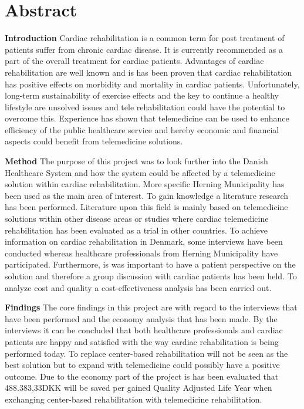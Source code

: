 \chapter{Abstract}

\textbf{Introduction} \newline
Cardiac rehabilitation is a common term for post treatment of patients suffer from chronic cardiac disease. It is currently recommended as a part of the overall treatment for cardiac patients. Advantages of cardiac rehabilitation are well known and is has been proven that cardiac rehabilitation has positive effects on morbidity and mortality in cardiac patients. Unfortunately, long-term sustainability of exercise effects and the key to continue a healthy lifestyle are unsolved issues and tele rehabilitation could have the potential to overcome this. Experience has shown that telemedicine can be used to enhance efficiency of the public healthcare service and hereby economic and financial aspects could benefit from telemedicine solutions.  

\textbf{Method} \newline
The purpose of this project was to look further into the Danish Healthcare System and how the system could be affected by a telemedicine solution within cardiac rehabilitation. More specific Herning Municipality has been used as the main area of interest. To gain knowledge a literature research has been performed. Literature upon this field is mainly based on telemedicine solutions within other disease areas or studies where cardiac telemedicine rehabilitation has been evaluated as a trial in other countries. To achieve information on cardiac rehabilitation in Denmark, some interviews have been conducted whereas healthcare professionals from Herning Municipality have participated. Furthermore, is was important to have a patient perspective on the solution and therefore a group discussion with cardiac patients has been held. To analyze cost and quality a cost-effectiveness analysis has been carried out.  

\textbf{Findings} \newline
The core findings in this project are with regard to the interviews that have been performed and the economy analysis that has been made. By the interviews it can be concluded that both healthcare professionals and cardiac patients are happy and satisfied with the way cardiac rehabilitation is being performed today. To replace center-based rehabilitation will not be seen as the best solution but to expand with telemedicine could possibly have a positive outcome. Due to the economy part of the project is has been evaluated that 488.383,33DKK will be saved per gained Quality Adjusted Life Year when exchanging center-based rehabilitation with telemedicine rehabilitation.  

